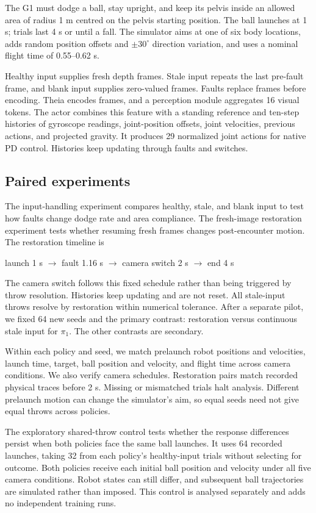 \documentclass[conference]{IEEEtran}
\begin{document}
The G1 must dodge a ball, stay upright, and keep its pelvis inside an allowed
area of radius 1 m centred on the pelvis starting position. The ball launches at 1 s;
trials last 4 s or until a fall. The simulator aims at one of six body locations,
adds random position offsets and $\pm30^\circ$ direction variation, and uses a
nominal flight time of 0.55--0.62 s.

Healthy input supplies fresh depth frames.
Stale input repeats the last pre-fault frame, and blank input supplies
zero-valued frames. Faults replace frames before encoding. Theia encodes frames,
and a perception module aggregates 16 visual tokens. The actor combines this
feature with a standing reference and ten-step histories of gyroscope readings,
joint-position offsets, joint velocities, previous actions, and projected
gravity. It produces 29 normalized joint actions for native PD control.
Histories keep updating through faults and switches.

\subsection{Paired experiments}
The input-handling experiment compares healthy, stale, and blank input to test
how faults change dodge rate and area compliance. The fresh-image restoration
experiment tests whether resuming fresh frames changes post-encounter motion.
The restoration timeline is
\begin{center}\footnotesize
launch 1 s $\rightarrow$ fault 1.16 s $\rightarrow$ camera switch 2 s $\rightarrow$ end 4 s
\end{center}
The camera switch follows this fixed schedule rather than being triggered by
throw resolution. Histories keep updating and are not reset. All stale-input
throws resolve by restoration within numerical tolerance. After a separate pilot,
we fixed 64 new seeds and the primary contrast: restoration versus continuous
stale input for $\pi_1$. The other contrasts are secondary.

Within each policy and seed, we match prelaunch robot positions and velocities,
launch time, target, ball position and velocity, and flight time across camera
conditions. We also verify camera schedules. Restoration pairs match recorded
physical traces before 2 s. Missing or mismatched trials halt analysis.
Different prelaunch motion can change the simulator's aim, so equal seeds need
not give equal throws across policies.

The exploratory shared-throw control tests whether the response differences
persist when both policies face the same ball launches. It uses 64 recorded
launches, taking 32 from each policy's healthy-input trials without selecting
for outcome. Both policies receive each initial ball position and velocity
under all five camera conditions. Robot states can still differ, and subsequent
ball trajectories are simulated rather than imposed. This control is analysed
separately and adds no independent training runs.
\end{document}
